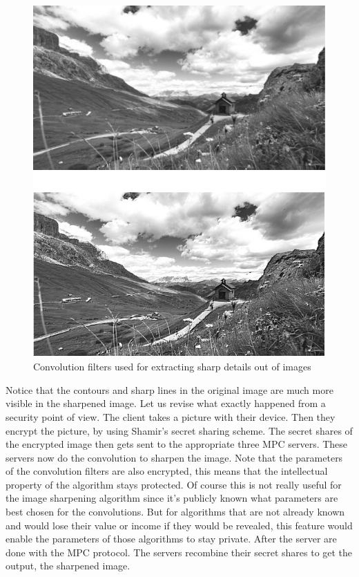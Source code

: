 \begin{figure}[H]
  \includegraphics[scale=0.5]{fig/sharpened_image.png}
  \centering
  \caption{Convolution filters used for extracting sharp details out of images}
  \label{fig:sharpened_image}
\end{figure}

Notice that the contours and sharp lines in the original image are much more visible in the sharpened image. Let us revise what exactly happened from a security point of view. The client takes a picture with their device. Then they encrypt the picture, by using Shamir's secret sharing scheme. The secret shares of the encrypted image then gets sent to the appropriate three MPC servers. These servers now do the convolution to sharpen the image. Note that the parameters of the convolution filters are also encrypted, this means that the intellectual property of the algorithm stays protected. Of course this is not really useful for the image sharpening algorithm since it's publicly known what parameters are best chosen for the convolutions. But for algorithms that are not already known and would lose their value or income if they would be revealed, this feature would enable the parameters of those algorithms to stay private. After the server are done with the MPC protocol. The servers recombine their secret shares to get the output, the sharpened image.

